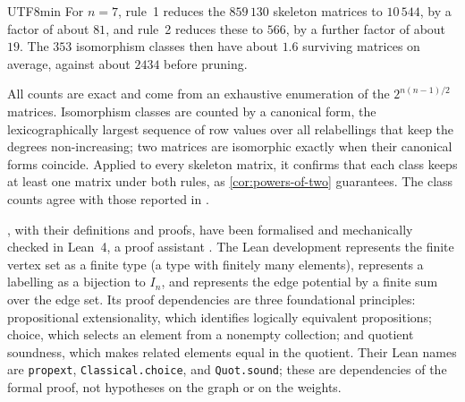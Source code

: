 \documentclass[reqno]{amsart}
\theoremstyle{definition}
\numberwithin{equation}{section}
\begin{document}
\begin{CJK*}{UTF8}{min}
For \(n=7\), rule~1 reduces the \(859\,130\) skeleton matrices to \(10\,544\), by
a factor of about \(81\), and rule~2 reduces these to \(566\), by a further
factor of about \(19\). The \(353\) isomorphism classes then have about \(1.6\)
surviving matrices on average, against about \(2434\) before pruning.

All counts are exact and come from an exhaustive enumeration of the
\(2^{n(n-1)/2}\) matrices. Isomorphism classes are counted by a canonical form,
the lexicographically largest sequence of row values over all relabellings that
keep the degrees non-increasing; two matrices are isomorphic exactly when their
canonical forms coincide. Applied to every skeleton
matrix, it confirms that each class keeps at least one matrix under both rules, as
\cref{cor:powers-of-two} guarantees.
The class counts agree with those reported in \cite{smooth-pudding-2024}.

, with their definitions and proofs,
have been formalised and mechanically checked in Lean~4, a proof assistant
\cite{degree-labeling-lean-2026}.
The Lean development represents the finite vertex set as a finite type (a type
with finitely many elements), represents a labelling as a bijection to
\(I_n\), and represents the edge potential by a finite sum over the edge set.
Its proof dependencies are three foundational principles: propositional extensionality,
which identifies logically equivalent propositions; choice, which selects an
element from a nonempty collection; and quotient soundness, which makes
related elements equal in the quotient. Their Lean names are
\texttt{propext}, \texttt{Classical.choice}, and \texttt{Quot.sound}; these are
dependencies of the formal proof, not hypotheses on the graph or on the weights.




\end{CJK*}
\end{document}
